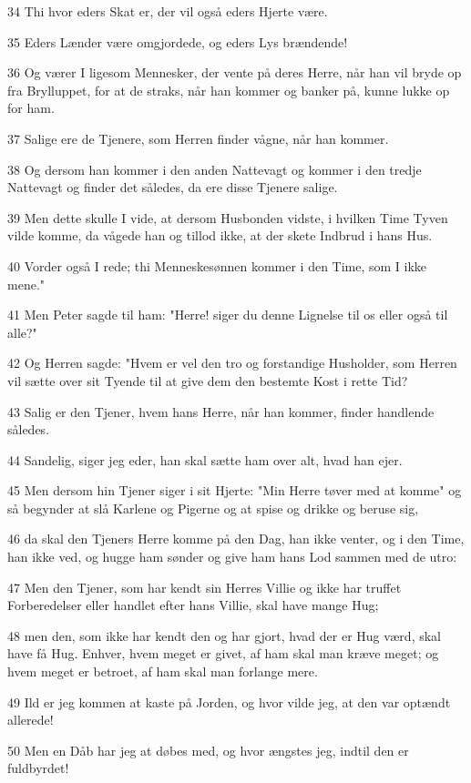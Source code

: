 \par 34 Thi hvor eders Skat er, der vil også eders Hjerte være.
\par 35 Eders Lænder være omgjordede, og eders Lys brændende!
\par 36 Og værer I ligesom Mennesker, der vente på deres Herre, når han vil bryde op fra Brylluppet, for at de straks, når han kommer og banker på, kunne lukke op for ham.
\par 37 Salige ere de Tjenere, som Herren finder vågne, når han kommer.
\par 38 Og dersom han kommer i den anden Nattevagt og kommer i den tredje Nattevagt og finder det således, da ere disse Tjenere salige.
\par 39 Men dette skulle I vide, at dersom Husbonden vidste, i hvilken Time Tyven vilde komme, da vågede han og tillod ikke, at der skete Indbrud i hans Hus.
\par 40 Vorder også I rede; thi Menneskesønnen kommer i den Time, som I ikke mene."
\par 41 Men Peter sagde til ham: "Herre! siger du denne Lignelse til os eller også til alle?"
\par 42 Og Herren sagde: "Hvem er vel den tro og forstandige Husholder, som Herren vil sætte over sit Tyende til at give dem den bestemte Kost i rette Tid?
\par 43 Salig er den Tjener, hvem hans Herre, når han kommer, finder handlende således.
\par 44 Sandelig, siger jeg eder, han skal sætte ham over alt, hvad han ejer.
\par 45 Men dersom hin Tjener siger i sit Hjerte: "Min Herre tøver med at komme" og så begynder at slå Karlene og Pigerne og at spise og drikke og beruse sig,
\par 46 da skal den Tjeners Herre komme på den Dag, han ikke venter, og i den Time, han ikke ved, og hugge ham sønder og give ham hans Lod sammen med de utro:
\par 47 Men den Tjener, som har kendt sin Herres Villie og ikke har truffet Forberedelser eller handlet efter hans Villie, skal have mange Hug;
\par 48 men den, som ikke har kendt den og har gjort, hvad der er Hug værd, skal have få Hug. Enhver, hvem meget er givet, af ham skal man kræve meget; og hvem meget er betroet, af ham skal man forlange mere.
\par 49 Ild er jeg kommen at kaste på Jorden, og hvor vilde jeg, at den var optændt allerede!
\par 50 Men en Dåb har jeg at døbes med, og hvor ængstes jeg, indtil den er fuldbyrdet!
